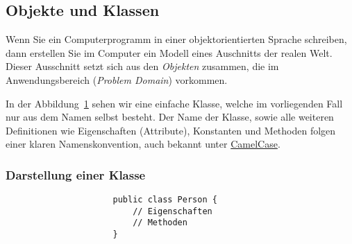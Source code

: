 \subsection{Objekte und Klassen}
\label{subsec:objects-classes}

Wenn Sie ein Computerprogramm in einer objektorientierten Sprache schreiben,
dann erstellen Sie im Computer ein Modell eines Auschnitts der realen Welt.
Dieser Ausschnitt setzt sich aus den \emph{Objekten} zusammen, die im
Anwendungsbereich (\emph{Problem Domain}) vorkommen.


In der Abbildung~\ref{fig:uml-class} sehen wir eine einfache Klasse,
welche im vorliegenden Fall nur aus dem Namen selbst besteht. Der Name der Klasse,
sowie alle weiteren Definitionen wie Eigenschaften (Attribute), Konstanten und Methoden
folgen einer klaren Namenskonvention, auch bekannt unter
\href{https://www.geeksforgeeks.org/java-naming-conventions/}{CamelCase}.

\begin{frame}[fragile]
    \frametitle<presentation>{Darstellung einer Klasse}

    \begin{figure}[ht]
        \centering
        \begin{minipage}[b]{0.5\textwidth}
            \centering
        \end{minipage}
        \begin{minipage}[b]{0.4\textwidth}
            \begin{verbatim}
                public class Person {
                    // Eigenschaften
                    // Methoden
                }
            \end{verbatim}
        \end{minipage}
        \label{fig:uml-class}
    \end{figure}

\end{frame}


